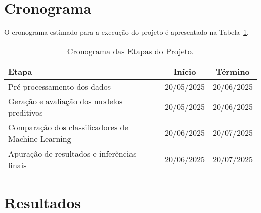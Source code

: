 \documentclass[12pt]{article}
\begin{document}
\section{Cronograma}
O cronograma estimado para a execução do projeto é apresentado na Tabela~\ref{tab:cronograma}.
\clearpage
\begin{table}[h!]
\centering
\caption{Cronograma das Etapas do Projeto.}
\label{tab:cronograma}
\begin{tabular}{@{}lcc@{}}
\toprule
\textbf{Etapa} & \textbf{Início} & \textbf{Término} \\
\midrule
Pré-processamento dos dados & 20/05/2025 & 20/06/2025 \\
Geração e avaliação dos modelos preditivos & 20/05/2025 & 20/06/2025 \\
Comparação dos classificadores de Machine Learning & 20/06/2025 & 20/07/2025 \\
Apuração de resultados e inferências finais & 20/06/2025 & 20/07/2025 \\
\bottomrule
\end{tabular}
\end{table}

\section{Resultados}



\renewcommand{\refname}{Referências}


\end{document}
